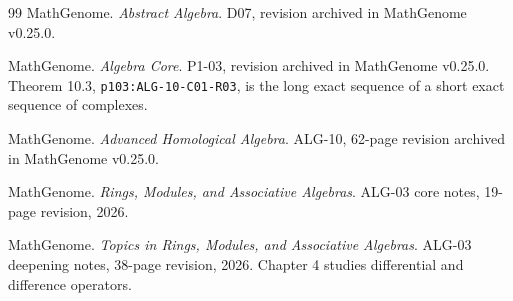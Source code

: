 \begin{thebibliography}{99}
MathGenome.
\emph{Abstract Algebra}.
D07, revision archived in MathGenome v0.25.0.

MathGenome.
\emph{Algebra Core}.
P1-03, revision archived in MathGenome v0.25.0.
Theorem 10.3, \texttt{p103:ALG-10-C01-R03}, is the long exact sequence
of a short exact sequence of complexes.

MathGenome.
\emph{Advanced Homological Algebra}.
ALG-10, 62-page revision archived in MathGenome v0.25.0.

MathGenome.
\emph{Rings, Modules, and Associative Algebras}.
ALG-03 core notes, 19-page revision, 2026.

MathGenome.
\emph{Topics in Rings, Modules, and Associative Algebras}.
ALG-03 deepening notes, 38-page revision, 2026.
Chapter 4 studies differential and difference operators.

\end{thebibliography}
\endgroup

